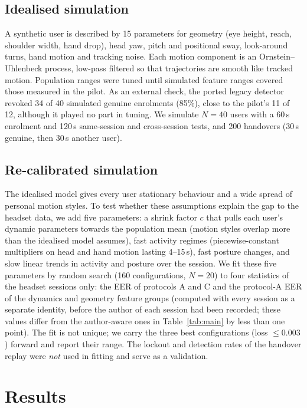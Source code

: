 \subsection{Idealised simulation}
A synthetic user is described by 15 parameters for geometry (eye height, reach, shoulder width, hand drop), head yaw, pitch and positional sway, look-around turns, hand motion and tracking noise. Each motion component is an Ornstein--Uhlenbeck process, low-pass filtered so that trajectories are smooth like tracked motion. Population ranges were tuned until simulated feature ranges covered those measured in the pilot. As an external check, the ported legacy detector revoked 34 of 40 simulated genuine enrolments (85\%), close to the pilot's 11 of 12, although it played no part in tuning. We simulate $N{=}40$ users with a 60\,s enrolment and 120\,s same-session and cross-session tests, and 200 handovers (30\,s genuine, then 30\,s another user).

\subsection{Re-calibrated simulation}
The idealised model gives every user stationary behaviour and a wide spread of personal motion styles. To test whether these assumptions explain the gap to the headset data, we add five parameters: a shrink factor $c$ that pulls each user's dynamic parameters towards the population mean (motion styles overlap more than the idealised model assumes), fast activity regimes (piecewise-constant multipliers on head and hand motion lasting 4--15\,s), fast posture changes, and slow linear trends in activity and posture over the session. We fit these five parameters by random search (160 configurations, $N{=}20$) to four statistics of the headset sessions only: the EER of protocols A and C and the protocol-A EER of the dynamics and geometry feature groups (computed with every session as a separate identity, before the author of each session had been recorded; these values differ from the author-aware ones in Table~\ref{tab:main} by less than one point). The fit is not unique; we carry the three best configurations (loss $\leq 0.003$) forward and report their range. The lockout and detection rates of the handover replay were \emph{not} used in fitting and serve as a validation.

\section{Results}
\label{sec:results}
